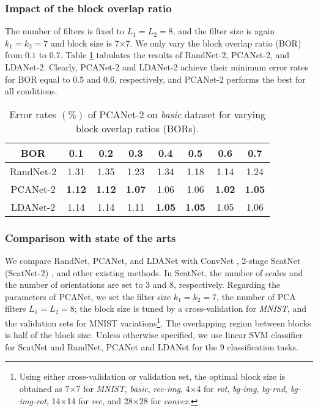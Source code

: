 \documentclass[10pt,journal,compsoc]{IEEEtran}
\begin{document}
\subsubsection{Impact of the block overlap ratio}
The number of filters is fixed to $L_1 = L_2 = 8$, and the filter size is again $k_1 = k_2 = 7$ and block size is 7$\times$7. We only vary the block overlap ratio (BOR) from $0.1$ to $0.7$. Table \ref{table: MNIST_basic_blockratio} tabulates the results of RandNet-2, PCANet-2, and LDANet-2. Clearly, PCANet-2 and LDANet-2 achieve their minimum error rates for BOR equal to 0.5 and 0.6, respectively, and PCANet-2 performs the best for all conditions.


\begin{table}\centering
\caption{Error rates $(\%)$ of PCANet-2 on {\em basic} dataset for varying block overlap ratios (BORs). }
\vspace{0.1cm}\begin{tabular}{c|c|c|c|c|c|c|c}
  \hline
BOR  & 0.1 & 0.2 & 0.3 & 0.4 & 0.5 & 0.6 & 0.7   \\ \hline \hline
  RandNet-2  & 1.31  & 1.35 & 1.23  & 1.34  & 1.18 & 1.14 & 1.24 \\
  PCANet-2   & {\bf 1.12} & {\bf 1.12} & {\bf 1.07} & 1.06 & 1.06 & {\bf 1.02}  & {\bf 1.05}  \\
  LDANet-2   & 1.14  &  1.14  &  1.11  &   {\bf 1.05}  &  {\bf 1.05}  &  1.05 &   1.06 \\
  \hline
\end{tabular}\label{table: MNIST_basic_blockratio}
\end{table}

\subsubsection{Comparison with state of the arts}
We compare RandNet, PCANet, and LDANet with ConvNet \cite{Jarrett2009}, 2-stage ScatNet (ScatNet-2) \cite{Bruna2013}, and other existing methods. In ScatNet, the number of scales and the number of orientations are set to 3 and 8, respectively. Regarding the parameters of PCANet, we set the filter size $k_1 = k_2 = 7$, the number of PCA filters $L_1 = L_2 = 8$; the block size is tuned by a cross-validation for {\it MNIST}, and the validation sets for MNIST variations\footnote{Using either cross-validation or validation set, the optimal block size is obtained as 7$\times$7 for {\it MNIST}, {\it basic}, {\it rec-img}, 4$\times$4 for {\it rot}, {\it bg-img}, {\it bg-rnd}, {\it bg-img-rot}, 14$\times$14 for {\it rec}, and 28$\times$28 for {\it convex}.}. The overlapping region between blocks is half of the block size. Unless otherwise specified, we use linear SVM classifier for ScatNet and RandNet, PCANet and LDANet for the 9 classification tasks.
\end{document}
